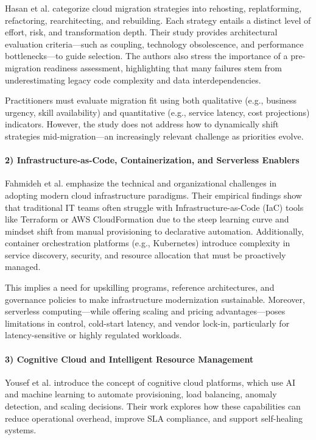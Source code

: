 \documentclass[12pt]{article}
\begin{document}
Hasan et al. \cite{hasan2023} categorize cloud migration strategies into rehosting, replatforming, refactoring, rearchitecting, and rebuilding. Each strategy entails a distinct level of effort, risk, and transformation depth. Their study provides architectural evaluation criteria—such as coupling, technology obsolescence, and performance bottlenecks—to guide selection. The authors also stress the importance of a pre-migration readiness assessment, highlighting that many failures stem from underestimating legacy code complexity and data interdependencies.

Practitioners must evaluate migration fit using both qualitative (e.g., business urgency, skill availability) and quantitative (e.g., service latency, cost projections) indicators. However, the study does not address how to dynamically shift strategies mid-migration—an increasingly relevant challenge as priorities evolve.

\paragraph{2) Infrastructure-as-Code, Containerization, and Serverless Enablers}

Fahmideh et al. \cite{fahmideh2019} emphasize the technical and organizational challenges in adopting modern cloud infrastructure paradigms. Their empirical findings show that traditional IT teams often struggle with Infrastructure-as-Code (IaC) tools like Terraform or AWS CloudFormation due to the steep learning curve and mindset shift from manual provisioning to declarative automation. Additionally, container orchestration platforms (e.g., Kubernetes) introduce complexity in service discovery, security, and resource allocation that must be proactively managed.

This implies a need for upskilling programs, reference architectures, and governance policies to make infrastructure modernization sustainable. Moreover, serverless computing—while offering scaling and pricing advantages—poses limitations in control, cold-start latency, and vendor lock-in, particularly for latency-sensitive or highly regulated workloads.

\paragraph{3) Cognitive Cloud and Intelligent Resource Management}

Yousef et al. \cite{yousef2024} introduce the concept of cognitive cloud platforms, which use AI and machine learning to automate provisioning, load balancing, anomaly detection, and scaling decisions. Their work explores how these capabilities can reduce operational overhead, improve SLA compliance, and support self-healing systems.
\end{document}
